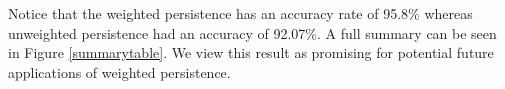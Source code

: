 \documentclass{amsart}
\newtheorem*{fibering lemma}{Fibering Lemma}
\newtheorem*{decomposition lemma}{Decomposition Lemma}
\newtheorem*{hurewicz theorem}{Hurewicz Theorem}
\theoremstyle{definition}
\begin{document}
\begin{comment}
\begin{table}[]
\centering
\caption{The confusion matrix for weighted persistence}
\label{Wt_conf}
\begin{tabular}{lccc}
                               & \multicolumn{1}{l}{}   & \multicolumn{1}{l}{Predicted} & \multicolumn{1}{l}{}      \\ \cline{2-4} 
\multicolumn{1}{l|}{}          & \multicolumn{1}{c|}{}  & \multicolumn{1}{c|}{0}        & \multicolumn{1}{c|}{1}    \\ \cline{2-4} 
\multicolumn{1}{c|}{Reference} & \multicolumn{1}{c|}{0} & \multicolumn{1}{c|}{36487}    & \multicolumn{1}{c|}{1450} \\ \cline{2-4} 
\multicolumn{1}{l|}{}          & \multicolumn{1}{c|}{1} & \multicolumn{1}{c|}{633}      & \multicolumn{1}{c|}{3430} \\ \cline{2-4} 
\end{tabular}
\end{table}


\begin{table}[]
\centering
\caption{The confusion matrix for unweighted persistence}
\label{UnWt_conf}
\begin{tabular}{lccc}
                               & \multicolumn{1}{l}{}   & \multicolumn{1}{l}{Predicted} & \multicolumn{1}{l}{}      \\ \cline{2-4} 
\multicolumn{1}{l|}{}          & \multicolumn{1}{c|}{}  & \multicolumn{1}{c|}{0}        & \multicolumn{1}{c|}{1}    \\ \cline{2-4} 
\multicolumn{1}{c|}{Reference} & \multicolumn{1}{c|}{0} & \multicolumn{1}{c|}{35869}    & \multicolumn{1}{c|}{2068} \\ \cline{2-4} 
\multicolumn{1}{l|}{}          & \multicolumn{1}{c|}{1} & \multicolumn{1}{c|}{1261}     & \multicolumn{1}{c|}{2802} \\ \cline{2-4} 
\end{tabular}
\end{table}
\end{comment}

Notice that the weighted persistence has an accuracy rate of 95.8\% whereas unweighted persistence had an accuracy of 92.07\%. A full summary can be seen in Figure \ref{summarytable}.  We view this result as promising for potential future applications of weighted persistence. 
\end{document}
